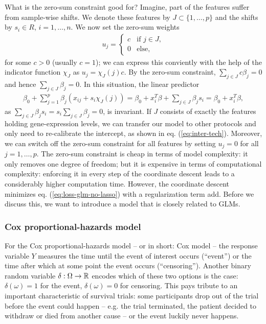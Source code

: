 What is the zero-sum constraint good for? Imagine, part of the features suffer from sample-wise 
shifts. We denote these features by $J \subset \{1, \ldots, p\}$ and the shifts by $s_i \in R$, 
$i = 1, \ldots, n$. We now set the zero-sum weights  
\begin{align}
    u_j =
    \begin{cases}
        c & \text{if } j \in J, \\
        0 & \text{else},
    \end{cases}
\end{align}
for some $c > 0$ (usually $c = 1$); we can express this conviently with the help of the indicator 
function $\chi_J$ as $u_j = \chi_J(j) c$. By the zero-sum constraint, $\sum_{j \in J} c \beta_j = 0$  
and hence $\sum_{j \in J} \beta_j = 0$. In this situation, the linear predictor 
\begin{align}
    \beta_0 + \sum_{j=1}^p \beta_j (x_{ij} + s_i \chi_J(j))
    = \beta_0 + x_i^T \beta + \sum_{j \in J} \beta_j s_i = \beta_0 + x_i^T \beta,
\end{align}
as $\sum_{j \in J} \beta_j s_i = s_i \sum_{j \in J} \beta_j = 0$, is invariant. If $J$ consists of 
exactly the features holding gene-expression levels, we can transfer our model to other protocols 
and only need to re-calibrate the intercept, as shown in eq. (\ref{eq:inter-tech}). Moreover, we 
can switch off the zero-sum constraint for all features by setting $u_j = 0$ for all 
$j = 1, \ldots, p$. The zero-sum constraint is cheap in terms of model complexity: it only removes 
one degree of freedom; but it is expensive in terms of computational complexity: enforcing it in
every step of the coordinate descent leads to a considerably higher computation time. However, the 
coordinate descent minimizes eq. (\ref{eq:loss-glm-no-lasso}) with a regularization term add. Before 
we discuss this, we want to introduce a model that is closely related to GLMs.

\subsubsection{Cox proportional-hazards model}\label{subsubsec:cox}

For the Cox proportional-hazards model -- or in short: Cox model -- the response variable $Y$ 
measures the time until the event of interest occurs (``event'') or the time after which at some 
point the 
event occurs (``censoring''). Another binary random variable $\delta: \Omega \to \mathbb{R}$ encodes 
which of these two options is the case: $\delta(\omega) = 1$ for the event, $\delta(\omega) = 0$ 
for censoring. This pays tribute to an important characteristic of survival trials: some
participants drop out of the trial before the event could happen -- e.g. the trial terminated, the 
patient decided to withdraw or died from another cause -- or the event luckily never happens.

